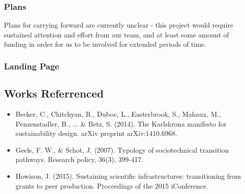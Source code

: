 \subsubsection{Plans}

Plans for carrying forward are currently unclear - this project would require sustained attention and effort from our team, and at least some amount of funding in order for us to be involved for extended periods of time.

\subsubsection{Landing Page}

\subsection{Works Referrenced}

\begin{itemize}
\item Becker, C., Chitchyan, R., Duboc, L., Easterbrook, S., Mahaux, M., Penzenstadler, B., ... \& Betz, S. (2014). The Karlskrona manifesto for sustainability design. arXiv preprint arXiv:1410.6968.
\item Geels, F. W., \& Schot, J. (2007). Typology of sociotechnical transition pathways. Research policy, 36(3), 399-417.
\item Howison, J. (2015). Sustaining scientific infrastructures: transitioning from grants to peer production. Proceedings of the 2015 iConference. 
\end{itemize}